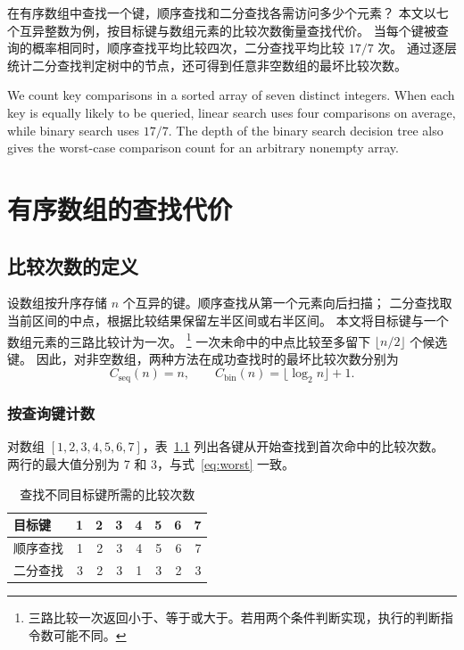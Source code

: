 \documentclass{fduthesis}
\begin{document}
\frontmatter
\makecoverpage
\makecommittee
\tableofcontents

\begin{fdusummary}
在有序数组中查找一个键，顺序查找和二分查找各需访问多少个元素？
本文以七个互异整数为例，按目标键与数组元素的比较次数衡量查找代价。
当每个键被查询的概率相同时，顺序查找平均比较四次，二分查找平均比较 $17/7$ 次。
通过逐层统计二分查找判定树中的节点，还可得到任意非空数组的最坏比较次数。
\end{fdusummary}
\begin{fdusummaryen}
We count key comparisons in a sorted array of seven distinct integers.
When each key is equally likely to be queried, linear search uses four
comparisons on average, while binary search uses $17/7$.
The depth of the binary search decision tree also gives the worst-case
comparison count for an arbitrary nonempty array.
\end{fdusummaryen}
\listoffigures
\listoftables

\mainmatter
\chapter{有序数组的查找代价}
\section{比较次数的定义}
\makeatletter
\ifdim\f@size pt=12bp\else\errmessage{Expected 12bp body text}\fi
\makeatother
\ifdim\baselineskip=20bp\else\errmessage{Expected 20bp body leading}\fi
设数组按升序存储 $n$ 个互异的键。顺序查找从第一个元素向后扫描；
二分查找取当前区间的中点，根据比较结果保留左半区间或右半区间\cite{knuth1998}。
本文将目标键与一个数组元素的三路比较计为一次。%
\footnote{三路比较一次返回小于、等于或大于。若用两个条件判断实现，执行的判断指令数可能不同。}
一次未命中的中点比较至多留下 $\lfloor n/2\rfloor$ 个候选键。
因此，对非空数组，两种方法在成功查找时的最坏比较次数分别为
\begin{equation}
  C_{\mathrm{seq}}(n)=n,\qquad C_{\mathrm{bin}}(n)=\lfloor\log_2 n\rfloor+1 .
  \label{eq:worst}
\end{equation}

\subsection{按查询键计数}
对数组 $[1,2,3,4,5,6,7]$，表~\ref{tab:counts} 列出各键从开始查找到首次命中的比较次数。
两行的最大值分别为 7 和 3，与式~\eqref{eq:worst} 一致。
\begin{table}[htbp]
  \centering
  \caption{查找不同目标键所需的比较次数}
  \label{tab:counts}
  \begin{tabular}{lrrrrrrr}
    \toprule
    目标键 & 1 & 2 & 3 & 4 & 5 & 6 & 7 \\
    \midrule
    顺序查找 & 1 & 2 & 3 & 4 & 5 & 6 & 7 \\
    二分查找 & 3 & 2 & 3 & 1 & 3 & 2 & 3 \\
    \bottomrule
  \end{tabular}
\end{table}
\end{document}

